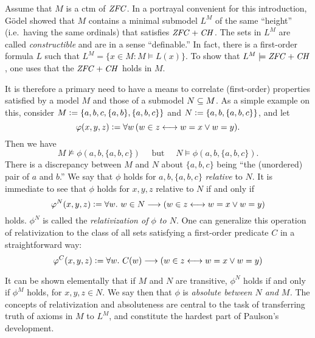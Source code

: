 Assume that $M$ is a ctm of $\mathit{ZFC}$. In a portrayal convenient for this
introduction, G\"odel showed that $M$ contains a minimal submodel
$L^M$ of the same ``height'' (i.e.\ having the same ordinals)
that satisfies $\mathit{ZFC}+\mathit{CH}$. The sets in $L^M$ are called
\emph{constructible} and are in a sense ``definable.'' In fact, there
is a first-order formula $L$ such that $L^M = \{x\in M : M\models
L(x)\}$. To show that  $L^M\models \mathit{ZFC}+\mathit{CH}$, one uses that the
$\mathit{ZFC}+\mathit{CH}$ holds in $M$.

It is therefore a primary need to have a means to correlate  (first-order)
properties satisfied by a model $M$ and those of a 
submodel $N\subseteq M$. As a simple example on this, consider 
$M\mathrel{\mathop:}= \{a,b,c, \{a,b\},\{a,b,c\}\}$ and
$N\mathrel{\mathop:}=\{a,b,\{a,b,c\}\}$, and let 
\[
\varphi(x,y,z)\mathrel{\mathop:}= \forall w \,( w\in z \longleftrightarrow w=x \vee w=y).
\]
Then we have
\[
M\not\models \phi(a,b,\{a,b,c\}) \quad\text{ but }\quad N\models \phi(a,b,\{a,b,c\}).
\]
There is a discrepancy between  $M$ and $N$ about $\{a,b,c\}$ being ``the
(unordered) pair of $a$ and $b$.'' We say that $\phi$ holds for
$a,b,\{a,b,c\}$ \emph{relative} to $N$. It is immediate to see that
$\phi$ holds  for $x,y,z$ relative to $N$ if and only if
\[
\varphi^N(x,y,z)\mathrel{\mathop:}= \forall w.\ w\in N\longrightarrow ( w\in z \longleftrightarrow w=x \vee w=y)
\] 
holds. $\phi^N$ is called the \emph{relativization of $\phi$ to
  $N$}. One can generalize this operation of relativization to the
class of all sets satisfying a first-order predicate $C$ in a
straightforward way:
\[
\varphi^C(x,y,z)\mathrel{\mathop:}= \forall w.\ C(w)\longrightarrow ( w\in z \longleftrightarrow w=x \vee w=y)
\] 

It can be shown elementally that if $M$ and $N$ are transitive,
$\phi^N$ holds if and only if $\phi^M$ holds,  for $x,y,z\in N$. We
say then that $\phi$ is \emph{absolute between $N$ and $M$.}
The concepts of relativization and absoluteness are central to the
task of transferring truth of axioms in $M$ to $L^M$, and constitute
the hardest part of Paulson's development.



